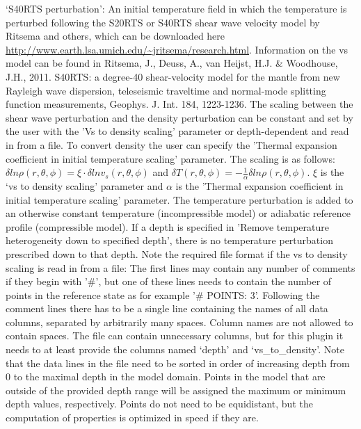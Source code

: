 \begin{itemize}
`S40RTS perturbation': An initial temperature field in which the temperature is perturbed following the S20RTS or S40RTS shear wave velocity model by Ritsema and others, which can be downloaded here \url{http://www.earth.lsa.umich.edu/~jritsema/research.html}. Information on the vs model can be found in Ritsema, J., Deuss, A., van Heijst, H.J. \& Woodhouse, J.H., 2011. S40RTS: a degree-40 shear-velocity model for the mantle from new Rayleigh wave dispersion, teleseismic traveltime and normal-mode splitting function measurements, Geophys. J. Int. 184, 1223-1236. The scaling between the shear wave perturbation and the density perturbation can be constant and set by the user with the 'Vs to density scaling' parameter or depth-dependent and read in from a file. To convert density the user can specify the 'Thermal expansion coefficient in initial temperature scaling' parameter. The scaling is as follows: $\delta ln \rho (r,\theta,\phi) = \xi \cdot \delta ln v_s(r,\theta, \phi)$ and $\delta T(r,\theta,\phi) = - \frac{1}{\alpha} \delta ln \rho(r,\theta,\phi)$. $\xi$ is the `vs to density scaling' parameter and $\alpha$ is the 'Thermal expansion coefficient in initial temperature scaling' parameter. The temperature perturbation is added to an otherwise constant temperature (incompressible model) or adiabatic reference profile (compressible model). If a depth is specified in 'Remove temperature heterogeneity down to specified depth', there is no temperature perturbation prescribed down to that depth.
Note the required file format if the vs to density scaling is read in from a file: The first lines may contain any number of comments if they begin with '\#', but one of these lines needs to contain the number of points in the reference state as for example '\# POINTS: 3'. Following the comment lines there has to be a single line containing the names of all data columns, separated by arbitrarily many spaces. Column names are not allowed to contain spaces. The file can contain unnecessary columns, but for this plugin it needs to at least provide the columns named `depth' and `vs\_to\_density'. Note that the data lines in the file need to be sorted in order of increasing depth from 0 to the maximal depth in the model domain. Points in the model that are outside of the provided depth range will be assigned the maximum or minimum depth values, respectively. Points do not need to be equidistant, but the computation of properties is optimized in speed if they are.


\end{itemize}

